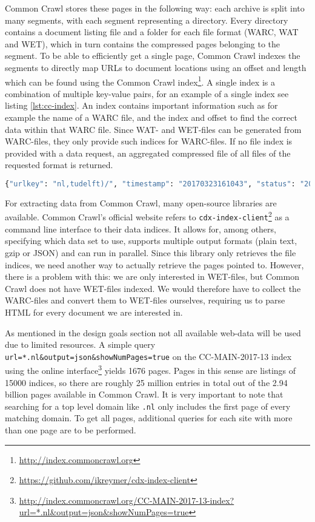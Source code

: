Common Crawl stores these pages in the following way: each archive is split into many segments, with each segment representing a directory. Every directory contains a document listing file and a folder for each file format (WARC, WAT and WET), which in turn contains the compressed pages belonging to the segment. To be able to efficiently get a single page, Common Crawl indexes the segments to directly map URLs to document locations using an offset and length which can be found using the Common Crawl index\footnote{\url{http://index.commoncrawl.org}}. A single index is a combination of multiple key-value pairs, for an example of a single index see listing \ref{lst:cc-index}. An index contains important information such as for example the name of a WARC file, and the index and offset to find the correct data within that WARC file. Since WAT- and WET-files can be generated from WARC-files, they only provide such indices for WARC-files. If no file index is provided with a data request, an aggregated compressed file of all files of the requested format is returned.

\begin{lstlisting}[language=Python, caption=Common Crawl index example, label={lst:cc-index}, numbers=none]
{"urlkey": "nl,tudelft)/", "timestamp": "20170323161043", "status": "200", "url": "http://www.tudelft.nl/", "filename": "crawl-data/CC-MAIN-2017-13/segments/1490218187144.60/warc/CC-MAIN-20170322212947-00594-ip-10-233-31-227.ec2.internal.warc.gz", "length": "6837", "mime": "text/html", "offset": "727926652", "digest": "WPTH3FM5VR7UGLA5PZS5L5YI22TNIKXG"}
\end{lstlisting}

For extracting data from Common Crawl, many open-source libraries are available. Common Crawl's official website refers to \texttt{cdx-index-client}\footnote{\url{https://github.com/ikreymer/cdx-index-client}} as a command line interface to their data indices. It allows for, among others, specifying which data set to use, supports multiple output formats (plain text, gzip or JSON) and can run in parallel. Since this library only retrieves the file indices, we need another way to actually retrieve the pages pointed to. However, there is a problem with this: we are only interested in WET-files, but Common Crawl does not have WET-files indexed. We would therefore have to collect the WARC-files and convert them to WET-files ourselves, requiring us to parse HTML for every document we are interested in.

As mentioned in the design goals section not all available web-data will be used due to limited resources. A simple query \texttt{url=*.nl\&output=json\&showNumPages=true} on the CC-MAIN-2017-13 index using the online interface\footnote{\url{http://index.commoncrawl.org/CC-MAIN-2017-13-index?url=*.nl\&output=json\&showNumPages=true}} yields 1676 pages. Pages in this sense are listings of 15000 indices, so there are roughly 25 million entries in total out of the 2.94 billion pages available in Common Crawl. It is very important to note that searching for a top level domain like \texttt{.nl} only includes the first page of every matching domain. To get all pages, additional queries for each site with more than one page are to be performed.


